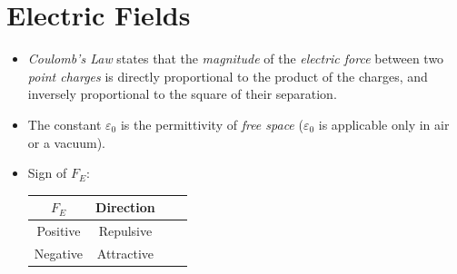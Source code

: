 \documentclass[oneside]{book}
\begin{document}
\chapter{Electric Fields}
\begin{itemize}
    \item \emph{Coulomb's Law} states that the \emph{magnitude} of the \emph{electric force} between two \emph{point charges} is directly proportional to the product of the charges, and inversely proportional to the square of their separation.
    \item The constant \(\varepsilon_0\) is the permittivity of \emph{free space} (\(\varepsilon_0\) is applicable only in air or a vacuum).
    \item Sign of \(F_E\):
    \begin{center}
        \begin{tabular}{|Sc|Sc|}
            \hline
            \(F_E\) & Direction\\
            \hline
            Positive & Repulsive\\
            \hline
            Negative & Attractive\\ 
            \hline
        \end{tabular}  
    \end{center}
    

\end{itemize}
\end{document}
